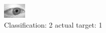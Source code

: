 \begin{figure}[h!]
\begin{center}
\includegraphics[width=0.60\columnwidth]{figures/ID2777_class_2_target_1.png}
\end{center}
\caption{ Classification: 2 actual target: 1}
\label{fig:ID2777_class_2_target_1}
\end{figure}
